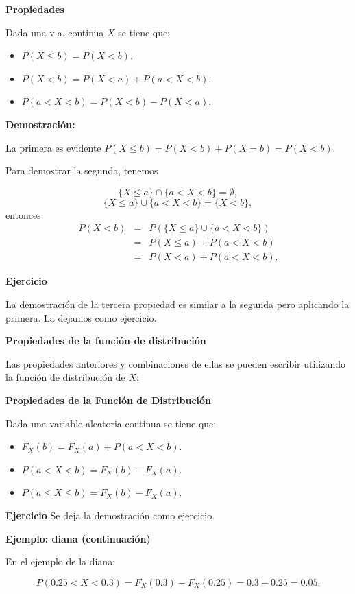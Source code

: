 \documentclass[
  letterpaper,
  DIV=11,
  numbers=noendperiod]{scrreprt}
\providecommand{\tightlist}{%
  \setlength{\itemsep}{0pt}\setlength{\parskip}{0pt}}\usepackage{longtable,booktabs,array}
\begin{document}
\textbf{Propiedades}

Dada una v.a. continua \(X\) se tiene que:

\begin{itemize}
\tightlist
\item
  \(P(X\leq b)=P(X<b)\).
\item
  \(P(X<b)=P(X<a)+P(a<X<b)\).
\item
  \(P(a<X<b)=P(X<b)-P(X<a)\).
\end{itemize}

\textbf{Demostración:}

La primera es evidente \(P(X\leq b)=P(X<b)+P(X=b)=P(X<b)\).

Para demostrar la segunda, tenemos

\[\{X\leq a\}\cap \{a<X<b\}=\emptyset,\]
\[\{X\leq a\}\cup \{a<X<b\}=\{X<b\},\] entonces \begin{eqnarray*}
P(X< b) & = & P(\{X\leq a\}\cup \{a<X<b\})\\
& = & P(X\leq a)+P(a<X<b) \\
& = & P(X< a)+P(a<X<b).
\end{eqnarray*}

\textbf{Ejercicio}

La demostración de la tercera propiedad es similar a la segunda pero
aplicando la primera. La dejamos como ejercicio.

\textbf{Propiedades de la función de distribución}

Las propiedades anteriores y combinaciones de ellas se pueden escribir
utilizando la función de distribución de \(X\):

\textbf{Propiedades de la Función de Distribución}

Dada una variable aleatoria continua se tiene que:

\begin{itemize}
\tightlist
\item
  \(F_{X}(b)=F_{X}(a)+P(a<X<b)\).
\item
  \(P(a<X<b)=F_{X}(b)-F_{X}(a)\).
\item
  \(P(a\leq X\leq b)=F_{X}(b)-F_{X}(a)\).
\end{itemize}

\textbf{Ejercicio} Se deja la demostración como ejercicio.

\textbf{Ejemplo: diana (continuación)}

En el ejemplo de la diana:

\[P(0.25<X<0.3)=F_{X}(0.3)-F_{X}(0.25)=0.3-0.25=0.05.\]
\end{document}
